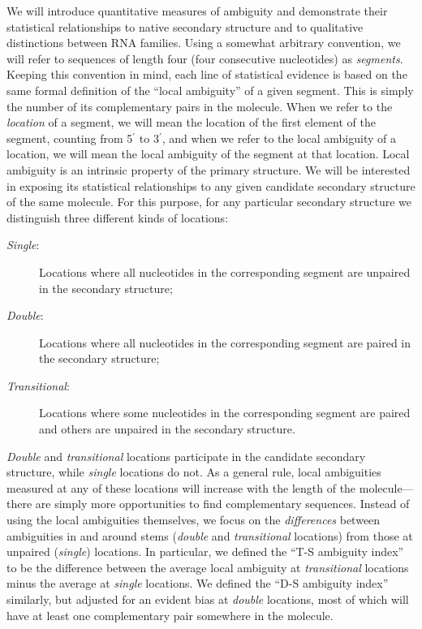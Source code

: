 \documentclass[10pt,letterpaper]{article}
\begin{document}
We will introduce quantitative measures of ambiguity and demonstrate their statistical relationships to native secondary structure and to qualitative distinctions between RNA families.
Using a somewhat arbitrary convention, we will
refer to sequences of length four (four consecutive nucleotides) as {\em segments}. Keeping this convention in mind, each line of statistical
evidence is based on the same formal definition of the ``local ambiguity'' of a given segment. This is simply the number of its complementary pairs in the molecule. 
When we refer to the {\em location} of a segment, we will mean the location of the first element of the segment, counting from 5$^\prime$ to 3$^\prime$, and  
when we refer to the local ambiguity of a location, we will mean the local ambiguity of the segment at that location. 
Local ambiguity is an intrinsic property of the primary structure. We will be interested in exposing its statistical relationships to any given candidate secondary structure of the same molecule. For this purpose, for any particular secondary structure we distinguish three different kinds of locations:
\begin{description}
	\item[\textit{Single}:] Locations where all nucleotides in the corresponding segment are unpaired in the secondary structure;
	\item[\textit{Double}:] Locations where all nucleotides in the corresponding segment are paired in the secondary structure;
	\item[\textit{Transitional}:] Locations where some nucleotides in the corresponding segment are paired and others are unpaired in the secondary structure.
\end{description}
{\em Double} and {\em transitional} locations participate in the candidate secondary structure, while {\em single} locations do not.
As a general rule, local ambiguities measured at any of these locations will increase with the length of the molecule---there are simply more opportunities to find complementary sequences.
Instead of using the local ambiguities themselves, we focus on the {\em differences} between ambiguities in and around stems ({\em double} and {\em transitional} locations) from those at unpaired ({\em single}) locations. In particular, we defined the ``T-S ambiguity index'' to be the difference between the average local ambiguity at {\em transitional} locations minus the average at {\em single} locations. We defined the ``D-S ambiguity index'' similarly, but adjusted for an evident bias at {\em double} locations, most of which will have at least one complementary pair somewhere in the molecule. 
\end{document}
